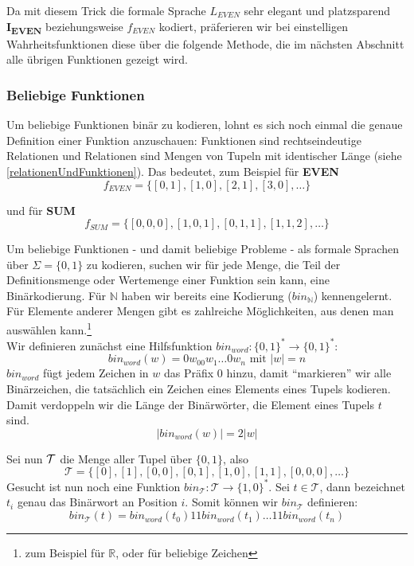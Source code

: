 Da mit diesem Trick die formale Sprache $L_{EVEN}$ sehr elegant und platzsparend
\textbf{I\textsubscript{EVEN}} beziehungsweise $f_{EVEN}$ kodiert,
präferieren wir bei einstelligen Wahrheitsfunktionen diese über die folgende Methode,
die im nächsten Abschnitt alle übrigen Funktionen gezeigt wird.

\subsubsection{Beliebige Funktionen}
Um beliebige Funktionen binär zu kodieren,
lohnt es sich noch einmal die genaue Definition einer Funktion anzuschauen:
Funktionen sind rechtseindeutige Relationen und Relationen sind Mengen von Tupeln mit identischer Länge (siehe \autoref{relationenUndFunktionen}).
Das bedeutet, zum Beispiel für \textbf{EVEN}
\[
    f_{EVEN} = \{ [0,1], [1,0], [2,1], [3,0], \ldots \}
\]

und für \textbf{SUM}
\[
    f_{SUM} = \{ [0,0,0], [1,0,1], [0,1,1], [1,1,2], \ldots \}
\]

Um beliebige Funktionen - und damit beliebige Probleme -
als formale Sprachen über $\Sigma = \{0,1\}$ zu kodieren,
suchen wir für jede Menge,
die Teil der Definitionsmenge oder Wertemenge einer Funktion sein kann,
eine Binärkodierung.
Für $\mathbb{N}$
haben wir bereits eine Kodierung ($bin_{\mathbb{N}}$) kennengelernt.
Für Elemente anderer Mengen gibt es zahlreiche Möglichkeiten,
aus denen man auswählen kann.\footnote{
    zum Beispiel \cite{ieee754} für $\mathbb{R}$,
    oder \cite{RFC3629} für beliebige Zeichen
}\\

\noindent
Wir definieren zunächst eine Hilfsfunktion $bin_{word}: \{0,1\}^* \rightarrow \{0,1\}^*$:
\[
    bin_{word}(w) = 0w_00w_1\ldots0w_n \text{ mit } |w| = n
\]
$bin_{word}$ fügt jedem Zeichen in $w$ das Präfix 0 hinzu,
damit ``markieren'' wir alle Binärzeichen,
die tatsächlich ein Zeichen eines Elements eines Tupels kodieren.
Damit verdoppeln wir die Länge der Binärwörter, die Element eines Tupels $t$ sind.
\[
    |bin_{word}(w)| = 2|w|
\]

\noindent
Sei nun $\cal{T}$ die Menge aller Tupel über $\{0,1\}$, also
\[
    \mathcal{T} = \{[0], [1], [0,0], [0,1], [1,0], [1,1], [0,0,0], \ldots \}
\]
Gesucht ist nun noch eine Funktion $bin_{\mathcal{T}}: \mathcal{T} \rightarrow \{1,0\}^*$.
Sei $t \in \mathcal{T}$, dann bezeichnet $t_i$ genau das Binärwort an Position $i$.
Somit können wir $bin_{\mathcal{T}}$ definieren:
\[
    bin_{\mathcal{T}}(t) = bin_{word}(t_0)11bin_{word}(t_1)\ldots 11bin_{word}(t_{n})
\]

